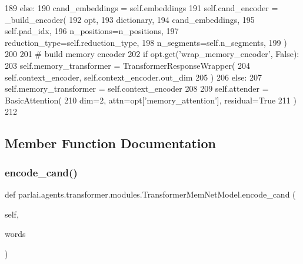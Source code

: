 \begin{DoxyCode}
189             \textcolor{keywordflow}{else}:
190                 cand\_embeddings = self.embeddings
191             self.cand\_encoder = \_build\_encoder(
192                 opt,
193                 dictionary,
194                 cand\_embeddings,
195                 self.pad\_idx,
196                 n\_positions=n\_positions,
197                 reduction\_type=self.reduction\_type,
198                 n\_segments=self.n\_segments,
199             )
200 
201         \textcolor{comment}{# build memory encoder}
202         \textcolor{keywordflow}{if} opt.get(\textcolor{stringliteral}{'wrap\_memory\_encoder'}, \textcolor{keyword}{False}):
203             self.memory\_transformer = TransformerResponseWrapper(
204                 self.context\_encoder, self.context\_encoder.out\_dim
205             )
206         \textcolor{keywordflow}{else}:
207             self.memory\_transformer = self.context\_encoder
208 
209         self.attender = BasicAttention(
210             dim=2, attn=opt[\textcolor{stringliteral}{'memory\_attention'}], residual=\textcolor{keyword}{True}
211         )
212 
\end{DoxyCode}


\subsection{Member Function Documentation}
\mbox{\label{classparlai_1_1agents_1_1transformer_1_1modules_1_1TransformerMemNetModel_a1e39cdf6357c9e8dd9f90e7f351e42a1}} 
\subsubsection{\texorpdfstring{encode\+\_\+cand()}{encode\_cand()}}
{\footnotesize\ttfamily def parlai.\+agents.\+transformer.\+modules.\+Transformer\+Mem\+Net\+Model.\+encode\+\_\+cand (\begin{DoxyParamCaption}\item[{}]{self,  }\item[{}]{words }\end{DoxyParamCaption})}

